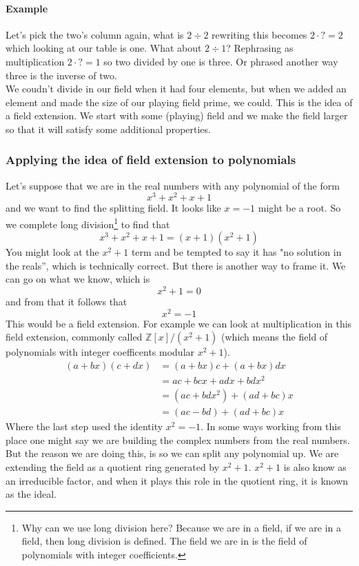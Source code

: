 \documentclass[12pt]{article}
\begin{document}
\paragraph*{Example} Let's pick the two's column again, what is $2 \div 2$ rewriting this becomes $2 \cdot ? = 2$ which looking at our table is one.   What about $2 \div 1$?  Rephrasing as multiplication $2 \cdot ? = 1$ so two divided by one is three. Or phrased another way three is the inverse of two.\\

We coudn't divide in our field when it had four elements, but when we added an element and made the size of our playing field prime, we could.  This is the idea of a field extension.  We start with some (playing) field and we make the field larger so that it will satisfy some additional properties. 

\subsubsection*{Applying the idea of field extension to polynomials}
Let's suppose that we are in the real numbers with any polynomial of the form $$x^3+x^2+x+1$$ and we want to find the splitting field.  It looks like $x=-1$ might be a root. So we complete long division\footnote{Why can we use long division here?  Because we are in a field, if we are in a field, then long division is defined.  The field we are in is the field of polynomials with integer coefficients.} to find that
$$x^3+x^2+x+1 = (x+1)(x^2+1)$$ 
You might look at the $x^2+1$ term and be tempted to say it has "no solution in the reals'', which is technically correct.  But there is another way to frame it.  We can go on what we know, which is 
$$x^2+1=0$$ 
and from that it follows that 
$$x^2=-1$$ 
This would be a field extension.  For example we can look at multiplication in this field extension, commonly called $\mathbb{Z}[x]/(x^2+1)$ (which means the field of polynomials with integer coefficents modular $x^2+1$).
\begin{align*}
(a+bx)(c+dx) & = (a+bx)c + (a+bx)dx \\
&= ac + bcx + adx +bdx^2 \\
&= (ac+bdx^2) + (ad + bc)x \\
&= (ac-bd) + (ad + bc)x
\end{align*}
Where the last step used the identity $x^2=-1$.  In some ways working from this place one might say we are building the complex numbers from the real numbers.  But the reason we are doing this, is so we can split any polynomial up.  We are extending the field as a quotient ring generated by $x^2+1$.  $x^2+1$ is also know as an irreducible factor, and when it plays this role in the quotient ring, it is known as the ideal.
\end{document}
